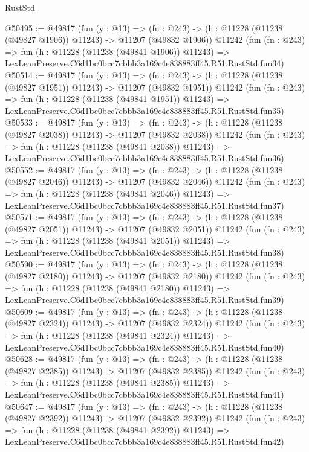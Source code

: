 \begin{lexlean}{RustStd}
\begin{coremodule}
@50495 := @49817
    (fun (y : @13) =>
    (fn : @243) -> (h : @11228 (@11238 (@49827 @1906)) @11243) -> @11207 (@49832 @1906))
    @11242
    (fun (fn : @243) =>
    fun (h : @11228 (@11238 (@49841 @1906)) @11243) =>
    LexLeanPreserve.C6d1bc0bcc7cbbb3a169c4e838883ff45.R51.RustStd.fun34)
@50514 := @49817
    (fun (y : @13) =>
    (fn : @243) -> (h : @11228 (@11238 (@49827 @1951)) @11243) -> @11207 (@49832 @1951))
    @11242
    (fun (fn : @243) =>
    fun (h : @11228 (@11238 (@49841 @1951)) @11243) =>
    LexLeanPreserve.C6d1bc0bcc7cbbb3a169c4e838883ff45.R51.RustStd.fun35)
@50533 := @49817
    (fun (y : @13) =>
    (fn : @243) -> (h : @11228 (@11238 (@49827 @2038)) @11243) -> @11207 (@49832 @2038))
    @11242
    (fun (fn : @243) =>
    fun (h : @11228 (@11238 (@49841 @2038)) @11243) =>
    LexLeanPreserve.C6d1bc0bcc7cbbb3a169c4e838883ff45.R51.RustStd.fun36)
@50552 := @49817
    (fun (y : @13) =>
    (fn : @243) -> (h : @11228 (@11238 (@49827 @2046)) @11243) -> @11207 (@49832 @2046))
    @11242
    (fun (fn : @243) =>
    fun (h : @11228 (@11238 (@49841 @2046)) @11243) =>
    LexLeanPreserve.C6d1bc0bcc7cbbb3a169c4e838883ff45.R51.RustStd.fun37)
@50571 := @49817
    (fun (y : @13) =>
    (fn : @243) -> (h : @11228 (@11238 (@49827 @2051)) @11243) -> @11207 (@49832 @2051))
    @11242
    (fun (fn : @243) =>
    fun (h : @11228 (@11238 (@49841 @2051)) @11243) =>
    LexLeanPreserve.C6d1bc0bcc7cbbb3a169c4e838883ff45.R51.RustStd.fun38)
@50590 := @49817
    (fun (y : @13) =>
    (fn : @243) -> (h : @11228 (@11238 (@49827 @2180)) @11243) -> @11207 (@49832 @2180))
    @11242
    (fun (fn : @243) =>
    fun (h : @11228 (@11238 (@49841 @2180)) @11243) =>
    LexLeanPreserve.C6d1bc0bcc7cbbb3a169c4e838883ff45.R51.RustStd.fun39)
@50609 := @49817
    (fun (y : @13) =>
    (fn : @243) -> (h : @11228 (@11238 (@49827 @2324)) @11243) -> @11207 (@49832 @2324))
    @11242
    (fun (fn : @243) =>
    fun (h : @11228 (@11238 (@49841 @2324)) @11243) =>
    LexLeanPreserve.C6d1bc0bcc7cbbb3a169c4e838883ff45.R51.RustStd.fun40)
@50628 := @49817
    (fun (y : @13) =>
    (fn : @243) -> (h : @11228 (@11238 (@49827 @2385)) @11243) -> @11207 (@49832 @2385))
    @11242
    (fun (fn : @243) =>
    fun (h : @11228 (@11238 (@49841 @2385)) @11243) =>
    LexLeanPreserve.C6d1bc0bcc7cbbb3a169c4e838883ff45.R51.RustStd.fun41)
@50647 := @49817
    (fun (y : @13) =>
    (fn : @243) -> (h : @11228 (@11238 (@49827 @2392)) @11243) -> @11207 (@49832 @2392))
    @11242
    (fun (fn : @243) =>
    fun (h : @11228 (@11238 (@49841 @2392)) @11243) =>
    LexLeanPreserve.C6d1bc0bcc7cbbb3a169c4e838883ff45.R51.RustStd.fun42)

\end{coremodule}
\end{lexlean}
